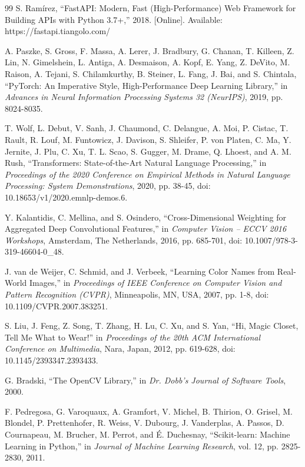 \documentclass[12pt,a4paper]{report}
\begin{document}
\begin{thebibliography}{99}
S. Ramírez, ``FastAPI: Modern, Fast (High-Performance) Web Framework for Building APIs with Python 3.7+,'' 2018. [Online]. Available: https://fastapi.tiangolo.com/

A. Paszke, S. Gross, F. Massa, A. Lerer, J. Bradbury, G. Chanan, T. Killeen, Z. Lin, N. Gimelshein, L. Antiga, A. Desmaison, A. Kopf, E. Yang, Z. DeVito, M. Raison, A. Tejani, S. Chilamkurthy, B. Steiner, L. Fang, J. Bai, and S. Chintala, ``PyTorch: An Imperative Style, High-Performance Deep Learning Library,'' in \textit{Advances in Neural Information Processing Systems 32 (NeurIPS)}, 2019, pp. 8024-8035.

T. Wolf, L. Debut, V. Sanh, J. Chaumond, C. Delangue, A. Moi, P. Cistac, T. Rault, R. Louf, M. Funtowicz, J. Davison, S. Shleifer, P. von Platen, C. Ma, Y. Jernite, J. Plu, C. Xu, T. L. Scao, S. Gugger, M. Drame, Q. Lhoest, and A. M. Rush, ``Transformers: State-of-the-Art Natural Language Processing,'' in \textit{Proceedings of the 2020 Conference on Empirical Methods in Natural Language Processing: System Demonstrations}, 2020, pp. 38-45, doi: 10.18653/v1/2020.emnlp-demos.6.

Y. Kalantidis, C. Mellina, and S. Osindero, ``Cross-Dimensional Weighting for Aggregated Deep Convolutional Features,'' in \textit{Computer Vision -- ECCV 2016 Workshops}, Amsterdam, The Netherlands, 2016, pp. 685-701, doi: 10.1007/978-3-319-46604-0\_48.

J. van de Weijer, C. Schmid, and J. Verbeek, ``Learning Color Names from Real-World Images,'' in \textit{Proceedings of IEEE Conference on Computer Vision and Pattern Recognition (CVPR)}, Minneapolis, MN, USA, 2007, pp. 1-8, doi: 10.1109/CVPR.2007.383251.

S. Liu, J. Feng, Z. Song, T. Zhang, H. Lu, C. Xu, and S. Yan, ``Hi, Magic Closet, Tell Me What to Wear!'' in \textit{Proceedings of the 20th ACM International Conference on Multimedia}, Nara, Japan, 2012, pp. 619-628, doi: 10.1145/2393347.2393433.

G. Bradski, ``The OpenCV Library,'' in \textit{Dr. Dobb's Journal of Software Tools}, 2000.

F. Pedregosa, G. Varoquaux, A. Gramfort, V. Michel, B. Thirion, O. Grisel, M. Blondel, P. Prettenhofer, R. Weiss, V. Dubourg, J. Vanderplas, A. Passos, D. Cournapeau, M. Brucher, M. Perrot, and É. Duchesnay, ``Scikit-learn: Machine Learning in Python,'' in \textit{Journal of Machine Learning Research}, vol. 12, pp. 2825-2830, 2011.


\end{thebibliography}
\end{document}
